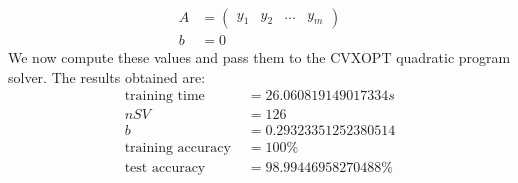 \documentclass[11pt]{article}
\begin{document}
\begin{equation}
  \begin{split}
    A &=
    \begin{pmatrix}
      y_1 & y_2 & \ldots & y_m
    \end{pmatrix}\\
    b &= 0
  \end{split}
\end{equation}
We now compute these values and pass them to the CVXOPT quadratic program solver. The results obtained are:
\begin{equation}
  \begin{split}
    \text{training time }&= 26.060819149017334s\\
    nSV &= 126\\
    b &= 0.29323351252380514\\
    \text{training accuracy }&= 100\%\\
    \text{test accuracy }&=98.99446958270488\%
  \end{split}
\end{equation}
\end{document}
